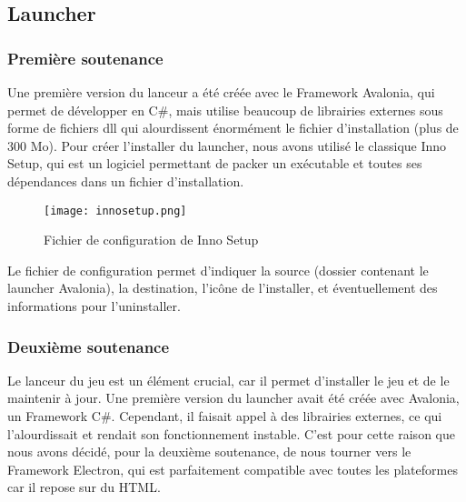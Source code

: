 \subsection{Launcher}

    \vspace{0.5cm}
    \subsubsection{Première soutenance}
    \vspace{0.5cm}

        Une première version du lanceur a été créée avec le Framework Avalonia, qui permet de développer 
        en C\#, mais utilise beaucoup de librairies externes sous forme de fichiers dll qui alourdissent 
        énormément le fichier d'installation (plus de 300 Mo). Pour créer l'installer du launcher, nous 
        avons utilisé le classique Inno Setup, qui est un logiciel permettant de packer un exécutable et 
        toutes ses dépendances dans un fichier d'installation. 

        \begin{figure}[hbt!]
            \centering
            \texttt{[image: innosetup.png]}
            \caption{Fichier de configuration de Inno Setup}
        \end{figure}

        Le fichier de configuration permet d'indiquer la source (dossier contenant le launcher Avalonia), la destination, 
        l'icône de l'installer, et éventuellement des informations pour l'uninstaller.

    \vspace{0.5cm}
    \subsubsection{Deuxième soutenance}
    \vspace{0.5cm}

        Le lanceur du jeu est un élément crucial, car il permet d'installer 
        le jeu et de le maintenir à jour. Une première version du launcher avait 
        été créée avec Avalonia, un Framework C\#. Cependant, il faisait appel à des 
        librairies externes, ce qui l'alourdissait et rendait son fonctionnement instable. 
        C'est pour cette raison que nous avons décidé, pour la deuxième soutenance, de nous 
        tourner vers le Framework Electron, qui est parfaitement compatible avec toutes les 
        plateformes car il repose sur du HTML.


